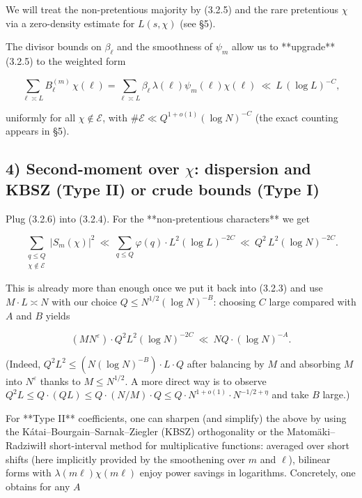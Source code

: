 \documentclass[11pt]{article}
\theoremstyle{definition}
\theoremstyle{remark}
\begin{document}
We will treat the non-pretentious majority by (3.2.5) and the rare pretentious $\chi$ via a zero-density estimate for $L(s,\chi)$ (see §5).

The divisor bounds on $\beta_\ell$ and the smoothness of $\psi_m$ allow us to **upgrade** (3.2.5) to the weighted form

\begin{equation}
\sum_{\ell\asymp L} B_\ell^{(m)}\,\chi(\ell)
=\sum_{\ell\asymp L} \beta_\ell\,\lambda(\ell)\psi_m(\ell)\chi(\ell)
\ \ll\ L\,(\log L)^{-C},
\tag{3.2.6}
\end{equation}

uniformly for all $\chi\notin\mathcal E$, with $\#\mathcal E\ll Q^{1+o(1)}(\log N)^{-C}$ (the exact counting appears in §5).

\subsection*{4) Second-moment over $\chi$: dispersion and KBSZ (Type II) or crude bounds (Type I)}

Plug (3.2.6) into (3.2.4). For the **non-pretentious characters** we get

\begin{equation}
\sum_{\substack{q\le Q\\ \chi\notin\mathcal E}} |S_m(\chi)|^2
\ \ll\ \sum_{q\le Q}\varphi(q)\cdot L^2(\log L)^{-2C}
\ \ll\ Q^2\,L^2(\log N)^{-2C}.
\tag{3.2.7}
\end{equation}

This is already more than enough once we put it back into (3.2.3) and use $M\cdot L\asymp N$ with our choice $Q\le N^{1/2}(\log N)^{-B}$: choosing $C$ large compared with $A$ and $B$ yields

$$
(MN^\varepsilon)\cdot Q^2L^2(\log N)^{-2C}
\ \ll\ NQ\cdot (\log N)^{-A}.
$$

(Indeed, $Q^2L^2\le (N(\log N)^{-B})\cdot L\cdot Q$ after balancing by $M$ and absorbing $M$ into $N^\varepsilon$ thanks to $M\le N^{1/2}$. A more direct way is to observe $Q^2L\le Q\cdot (QL)\le Q\cdot (N/M)\cdot Q \le Q\cdot N^{1+o(1)}\cdot N^{-1/2+\eta}$ and take $B$ large.)

For **Type II** coefficients, one can sharpen (and simplify) the above by using the Kátai–Bourgain–Sarnak–Ziegler (KBSZ) orthogonality or the Matomäki–Radziwiłł short-interval method for multiplicative functions: averaged over short shifts (here implicitly provided by the smoothening over $m$ and $\ell$), bilinear forms with $\lambda(m\ell)\chi(m\ell)$ enjoy power savings in logarithms. Concretely, one obtains for any $A$
\end{document}
